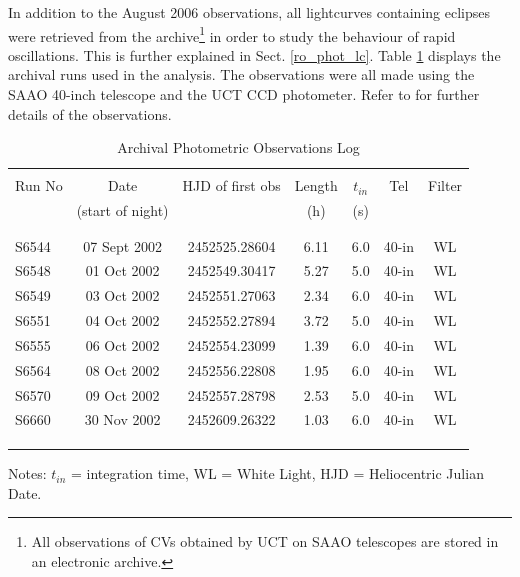In addition to the August 2006 observations, all lightcurves containing eclipses were retrieved from the archive\footnote{All observations of CVs obtained by UCT on SAAO telescopes are stored in an electronic archive.} in order to study the behaviour of rapid oscillations. This is further explained in Sect. \ref{ro_phot_lc}. Table \ref{archive_obslog} displays the archival runs used in the analysis. The observations were all made using the SAAO 40-inch telescope and the UCT CCD photometer. Refer to \cite{WWP} for further details of the observations.



\begin{table}
\caption[Archival Photometric Observations Log]{Archival Photometric Observations Log}
\begin{small}
\centering
\begin{tabular}{lcccccc}
\hline\hline\\ Run No & Date            & HJD of first obs & Length & $t_{in}$ & Tel & Filter \\ 
        &(start of night) &        &    (h)   & (s) &       & \\\\ \hline  \\

S6544  &   07 Sept 2002   &  2452525.28604  &  6.11  &  6.0 & 40-in & WL \\
S6548  &   01 Oct 2002    &  2452549.30417  &  5.27  &  5.0 & 40-in & WL \\
S6549  &   03 Oct 2002    &  2452551.27063  &  2.34  &  6.0 & 40-in & WL \\
S6551  &   04 Oct 2002    &  2452552.27894  &  3.72  &  5.0 & 40-in & WL \\
S6555  &   06 Oct 2002    &  2452554.23099  &  1.39  &  6.0 & 40-in & WL \\
S6564  &   08 Oct 2002    &  2452556.22808  &  1.95  &  6.0 & 40-in & WL \\
S6570  &   09 Oct 2002    &  2452557.28798  &  2.53  &  5.0 & 40-in & WL \\
S6660  &   30 Nov 2002   &  2452609.26322  &  1.03  &  6.0 & 40-in & WL \\

\\ \hline \\\\

\end{tabular}
Notes: $t_{in}$ = integration time, WL = White Light, HJD = Heliocentric Julian Date.
\end{small}

\label{archive_obslog}
\end{table}







